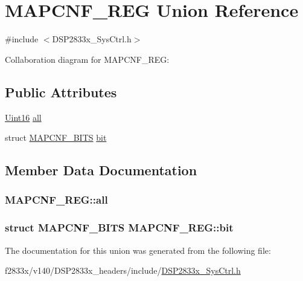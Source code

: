 \hypertarget{union_m_a_p_c_n_f___r_e_g}{}\section{M\+A\+P\+C\+N\+F\+\_\+\+R\+E\+G Union Reference}
\label{union_m_a_p_c_n_f___r_e_g}


{\ttfamily \#include $<$D\+S\+P2833x\+\_\+\+Sys\+Ctrl.\+h$>$}



Collaboration diagram for M\+A\+P\+C\+N\+F\+\_\+\+R\+E\+G\+:
\subsection*{Public Attributes}
\begin{DoxyCompactItemize}
\item 
\hyperlink{_d_s_p2833x___device_8h_a59a9f6be4562c327cbfb4f7e8e18f08b}{Uint16} \hyperlink{union_m_a_p_c_n_f___r_e_g_aa3db64ec79e3bbd1b2d6fe6354beee60}{all}
\item 
struct \hyperlink{struct_m_a_p_c_n_f___b_i_t_s}{M\+A\+P\+C\+N\+F\+\_\+\+B\+I\+T\+S} \hyperlink{union_m_a_p_c_n_f___r_e_g_a3c72acb0a152d5283af6275d62098e07}{bit}
\end{DoxyCompactItemize}


\subsection{Member Data Documentation}
\hypertarget{union_m_a_p_c_n_f___r_e_g_aa3db64ec79e3bbd1b2d6fe6354beee60}{}
\subsubsection[{all}]{ M\+A\+P\+C\+N\+F\+\_\+\+R\+E\+G\+::all}\label{union_m_a_p_c_n_f___r_e_g_aa3db64ec79e3bbd1b2d6fe6354beee60}
\hypertarget{union_m_a_p_c_n_f___r_e_g_a3c72acb0a152d5283af6275d62098e07}{}
\subsubsection[{bit}]{\setlength{\rightskip}{0pt plus 5cm}struct {\bf M\+A\+P\+C\+N\+F\+\_\+\+B\+I\+T\+S} M\+A\+P\+C\+N\+F\+\_\+\+R\+E\+G\+::bit}\label{union_m_a_p_c_n_f___r_e_g_a3c72acb0a152d5283af6275d62098e07}


The documentation for this union was generated from the following file\+:\begin{DoxyCompactItemize}
\item 
f2833x/v140/\+D\+S\+P2833x\+\_\+headers/include/\hyperlink{_d_s_p2833x___sys_ctrl_8h}{D\+S\+P2833x\+\_\+\+Sys\+Ctrl.\+h}\end{DoxyCompactItemize}
